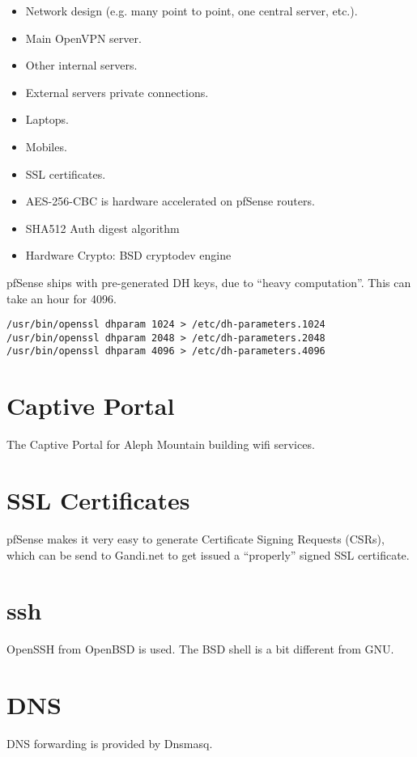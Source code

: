\begin{itemize}
 \item Network design (e.g. many point to point, one central server, etc.).
 \item Main OpenVPN server.
 \item Other internal servers.
 \item External servers private connections.
 \item Laptops.
 \item Mobiles.
 \item SSL certificates.
 \item AES-256-CBC is hardware accelerated on pfSense routers.
 \item SHA512 Auth digest algorithm
 \item Hardware Crypto: BSD cryptodev engine
\end{itemize}


pfSense ships with pre-generated DH keys, due to ``heavy computation''.
This can take an hour for 4096.
\begin{verbatim}
/usr/bin/openssl dhparam 1024 > /etc/dh-parameters.1024
/usr/bin/openssl dhparam 2048 > /etc/dh-parameters.2048
/usr/bin/openssl dhparam 4096 > /etc/dh-parameters.4096
\end{verbatim}



\section{Captive Portal}
The Captive Portal for Aleph Mountain building wifi services.


\section{SSL Certificates}
pfSense makes it very easy to generate Certificate Signing Requests (CSRs),
which can be send to Gandi.net to get issued a ``properly'' signed SSL
certificate.


\section{ssh}
OpenSSH from OpenBSD is used. The BSD shell is a bit different from GNU.


\section{DNS}
DNS forwarding is provided by Dnsmasq.

